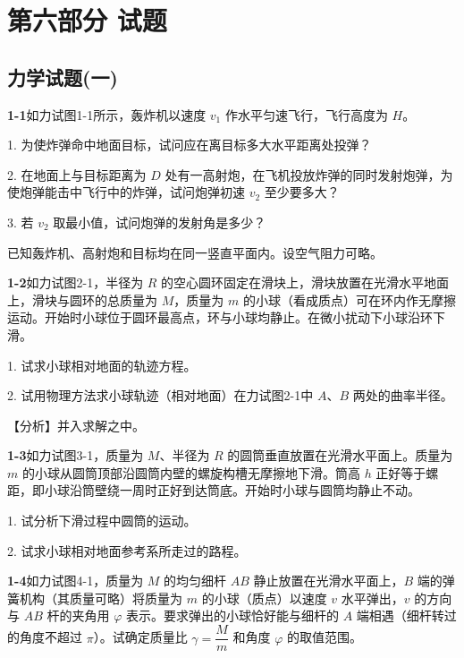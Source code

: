\chapter{第六部分 试题}


\section*{力学试题(一)}

\textbf{1-1}\quad 如力试图1-1所示，轰炸机以速度 $v_{1}$ 作水平匀速飞行，飞行高度为 $H$。

1. 为使炸弹命中地面目标，试问应在离目标多大水平距离处投弹？

2. 在地面上与目标距离为 $D$ 处有一高射炮，在飞机投放炸弹的同时发射炮弹，为使炮弹能击中飞行中的炸弹，试问炮弹初速 $v_{2}$ 至少要多大？

3. 若 $v_{2}$ 取最小值，试问炮弹的发射角是多少？

已知轰炸机、高射炮和目标均在同一竖直平面内。设空气阻力可略。
\vfill

\textbf{1-2}\quad 如力试图2-1，半径为 $R$ 的空心圆环固定在滑块上，滑块放置在光滑水平地面上，滑块与圆环的总质量为 $M$，质量为 $m$ 的小球（看成质点）可在环内作无摩擦运动。开始时小球位于圆环最高点，环与小球均静止。在微小扰动下小球沿环下滑。


1. 试求小球相对地面的轨迹方程。

2. 试用物理方法求小球轨迹（相对地面）在力试图2-1中 $A$、$B$ 两处的曲率半径。

【分析】并入求解之中。
\vfill

\newpage
\textbf{1-3}\quad 如力试图3-1，质量为 $M$、半径为 $R$ 的圆筒垂直放置在光滑水平面上。质量为 $m$ 的小球从圆筒顶部沿圆筒内壁的螺旋构槽无摩擦地下滑。筒高 $h$ 正好等于螺距，即小球沿筒壁绕一周时正好到达筒底。开始时小球与圆筒均静止不动。

1. 试分析下滑过程中圆筒的运动。

2. 试求小球相对地面参考系所走过的路程。
\vfill

\textbf{1-4}\quad 如力试图4-1，质量为 $M$ 的均匀细杆 $AB$ 静止放置在光滑水平面上，$B$ 端的弹簧机构（其质量可略）将质量为 $m$ 的小球（质点）以速度 $v$ 水平弹出，$v$ 的方向与 $AB$ 杆的夹角用 $\varphi$ 表示。要求弹出的小球恰好能与细杆的 $A$ 端相遇（细杆转过的角度不超过 $\pi$）。试确定质量比 $\gamma = \dfrac{M}{m}$ 和角度 $\varphi$ 的取值范围。
\vfill


